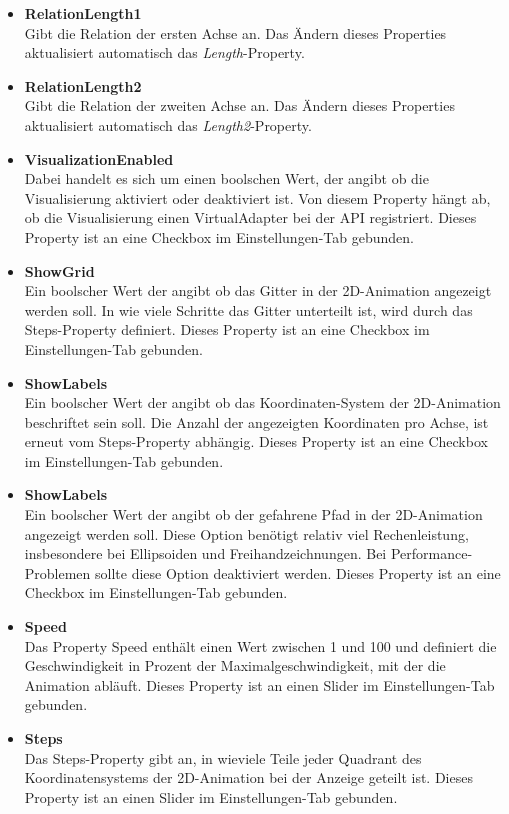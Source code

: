 \begin{itemize}
\item \textbf{RelationLength1}\\
Gibt die Relation der ersten Achse an. Das Ändern dieses Properties aktualisiert automatisch das \textit{Length}-Property.
\item \textbf{RelationLength2}\\
Gibt die Relation der zweiten Achse an. Das Ändern dieses Properties aktualisiert automatisch das \textit{Length2}-Property.
\item \textbf{VisualizationEnabled}\\
Dabei handelt es sich um einen boolschen Wert, der angibt ob die Visualisierung aktiviert oder deaktiviert ist. Von diesem Property hängt ab, ob die Visualisierung einen VirtualAdapter bei der API registriert. Dieses Property ist an eine Checkbox im Einstellungen-Tab gebunden.
\item \textbf{ShowGrid}\\
Ein boolscher Wert der angibt ob das Gitter in der 2D-Animation angezeigt werden soll. In wie viele Schritte das Gitter unterteilt ist, wird durch das Steps-Property definiert. Dieses Property ist an eine Checkbox im Einstellungen-Tab gebunden.
\item \textbf{ShowLabels}\\
Ein boolscher Wert der angibt ob das Koordinaten-System der 2D-Animation beschriftet sein soll. Die Anzahl der angezeigten Koordinaten pro Achse, ist erneut vom Steps-Property abhängig. Dieses Property ist an eine Checkbox im Einstellungen-Tab gebunden.
\item \textbf{ShowLabels}\\
Ein boolscher Wert der angibt ob der gefahrene Pfad in der 2D-Animation angezeigt werden soll. Diese Option benötigt relativ viel Rechenleistung, insbesondere bei Ellipsoiden und Freihandzeichnungen. Bei Performance-Problemen sollte diese Option deaktiviert werden. Dieses Property ist an eine Checkbox im Einstellungen-Tab gebunden.
\item \textbf{Speed}\\
Das Property Speed enthält einen Wert zwischen 1 und 100 und definiert die Geschwindigkeit in Prozent der Maximalgeschwindigkeit, mit der die Animation abläuft. Dieses Property ist an einen Slider im Einstellungen-Tab gebunden.
\item \textbf{Steps}\\
Das Steps-Property gibt an, in wieviele Teile jeder Quadrant des Koordinatensystems der 2D-Animation bei der Anzeige geteilt ist. Dieses Property ist an einen Slider im Einstellungen-Tab gebunden.

\end{itemize}
